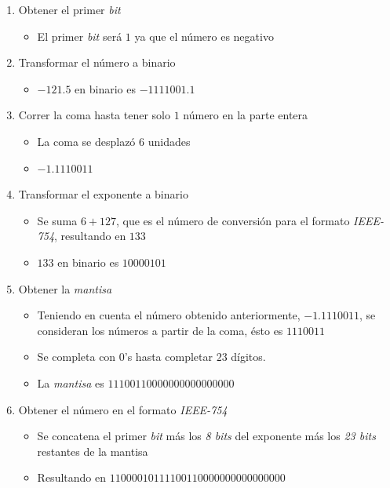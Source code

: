\documentclass[12pt]{article}
\begin{document}
\begin{enumerate}
    \setlength{\parskip}{-8pt}
    \item Obtener el primer \textit{bit} 
        \begin{itemize}
            \setlength{\parskip}{-8pt}
            \item El primer \textit{bit} será $1$ ya que el número es negativo
        \end{itemize}
    \item Transformar el número a binario
        \begin{itemize}
            \setlength{\parskip}{-8pt}
            \item $-121.5$ en binario es $-1111001.1$
        \end{itemize}
    \item Correr la coma hasta tener solo $1$ número en la parte entera
        \begin{itemize}
            \setlength{\parskip}{-8pt}
            \item La coma se desplazó $6$ unidades
            \item $-1.1110011$
        \end{itemize}
    \item Transformar el exponente a binario
        \begin{itemize}
            \setlength{\parskip}{-8pt}
            \item Se suma $6 + 127$, que es el número de conversión para el
                formato \textit{IEEE-754}, resultando en $133$
            \item $133$ en binario es $10000101$
        \end{itemize}
    \item Obtener la \textit{mantisa} 
        \begin{itemize}
            \setlength{\parskip}{-8pt}
            \item Teniendo en cuenta el número obtenido anteriormente, 
                $-1.1110011$, se consideran los números a partir de la coma,
                ésto es $1110011$
            \item Se completa con $0$'s hasta completar $23$ dígitos.
            \item La \textit{mantisa} es $11100110000000000000000$
        \end{itemize}
    \item Obtener el número en el formato \textit{IEEE-754} 
        \begin{itemize}
            \setlength{\parskip}{-8pt}
            \item Se concatena el primer \textit{bit} más los \textit{8 bits} 
                del exponente más los \textit{23 bits} restantes de la mantisa
            \item Resultando en $11000010111100110000000000000000$
        \end{itemize}
\end{enumerate}
\end{document}
